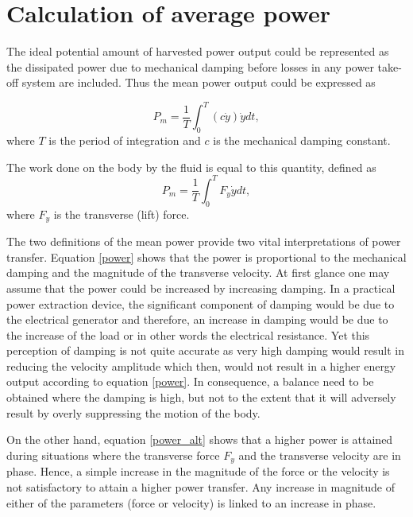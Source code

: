 \section{Calculation of average power}

The ideal potential amount of harvested power output could be represented as the dissipated power due to mechanical damping before losses in any power take-off system are included. Thus the mean power output could be expressed as 


\begin{equation}
\label{power}
P_{m}=\frac{1}{T}\int_{0}^{T}(c\dot{y})\dot{y} dt,
\end{equation}
where $T$ is the period of integration and $c$ is the mechanical damping constant. 

The work done on the body by the fluid is equal to this quantity, defined as
\begin{equation}
\label{power_alt}
P_{m}=\frac{1}{T}\int_{0}^{T}F_y\dot{y} dt,
\end{equation}
where $F_y$ is the transverse (lift) force.

The two definitions of the mean power provide two vital interpretations of power transfer. Equation \ref{power} shows that the power is proportional to the mechanical damping and the magnitude of the transverse velocity. At first glance one may assume that the power could be increased by increasing damping. In a practical power extraction device, the significant component of damping would be due to the electrical generator and therefore, an increase in damping would be due to the increase of the load or in other words the electrical resistance. Yet this perception of damping is not quite accurate as very high damping would result in reducing the velocity amplitude which then, would not result in a higher energy output according to equation \ref{power}. In consequence, a balance need to be obtained where the damping is high, but not to the extent that it will adversely result by overly suppressing the motion of the body.  

On the other hand, equation \ref{power_alt} shows that a higher power is attained during situations where the transverse force $F_{y}$ and the transverse velocity are in phase. Hence, a simple increase in the magnitude of the force or the velocity is not satisfactory to attain a higher power transfer. Any increase in magnitude of either of the parameters (force or velocity) is linked to an increase in phase.   



